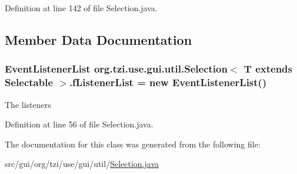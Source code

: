 Definition at line 142 of file Selection.\-java.



\subsection{Member Data Documentation}
\hypertarget{classorg_1_1tzi_1_1use_1_1gui_1_1util_1_1_selection_3_01_t_01extends_01_selectable_01_4_afa90c9be53d9dc2075b8fad59645ec1f}{
\subsubsection[{f\-Listener\-List}]{\setlength{\rightskip}{0pt plus 5cm}Event\-Listener\-List org.\-tzi.\-use.\-gui.\-util.\-Selection$<$ T extends {\bf Selectable} $>$.f\-Listener\-List = new Event\-Listener\-List()\hspace{0.3cm}{\ttfamily [protected]}}}\label{classorg_1_1tzi_1_1use_1_1gui_1_1util_1_1_selection_3_01_t_01extends_01_selectable_01_4_afa90c9be53d9dc2075b8fad59645ec1f}
The listeners 

Definition at line 56 of file Selection.\-java.



The documentation for this class was generated from the following file\-:\begin{DoxyCompactItemize}
\item 
src/gui/org/tzi/use/gui/util/\hyperlink{_selection_8java}{Selection.\-java}\end{DoxyCompactItemize}
